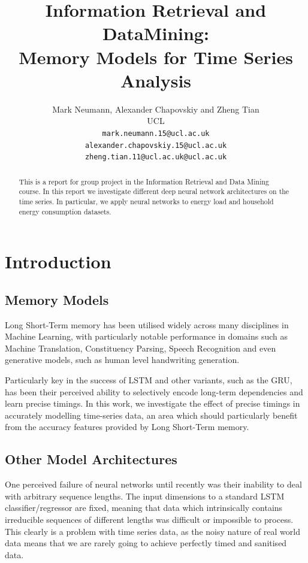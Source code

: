 \documentclass{article} %
\title{Information Retrieval and DataMining:\\
		Memory Models for Time Series Analysis
}
\author{
Mark Neumann, Alexander Chapovskiy and Zheng Tian\\ %
UCL\\
\texttt{mark.neumann.15@ucl.ac.uk} \\
\texttt{alexander.chapovskiy.15@ucl.ac.uk} \\
\texttt{zheng.tian.11@ucl.ac.uk@ucl.ac.uk} \\
}
\begin{document}
\maketitle
\graphicspath{{images/}}

\begin{abstract}
This is a report for group project in the Information Retrieval and Data 
Mining course. In this report we investigate different deep neural network
architectures on the time series. In particular, we apply neural 
networks to energy load and household energy consumption datasets.
\end{abstract}


\section{Introduction}
\label{sec:intro}

\subsection{Memory Models}
Long Short-Term memory\cite{LSTM} has been utilised widely across many disciplines in Machine Learning, with particularly notable performance in domains such as Machine Translation\cite{Sutskever}, Constituency Parsing\cite{Parsing}, Speech Recognition and even generative models, such as human level handwriting generation.\cite{Graves} 

Particularly key in the success of LSTM and other variants, such as the GRU, has been their perceived ability to selectively encode long-term dependencies and learn precise timings. In this work, we investigate the effect of precise timings in accurately modelling time-series data, an area which should particularly benefit from the accuracy features provided by Long Short-Term memory.

\subsection{Other Model Architectures}

One perceived failure of neural networks until recently was their inability to deal with arbitrary sequence lengths. The input dimensions to a standard LSTM classifier/regressor are fixed, meaning that data which intrinsically contains irreducible sequences of different lengths was difficult or impossible to process. This clearly is a problem with time series data, as the noisy nature of real world data means that we are rarely going to achieve perfectly timed and sanitised data.
\end{document}
